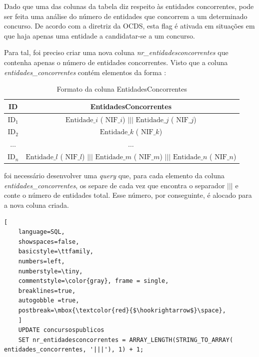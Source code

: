 Dado que uma das colunas da tabela diz respeito às entidades concorrentes, pode ser feita uma análise do número de entidades que concorrem a um determinado concurso. De acordo com a diretriz da OCDS, esta flag é ativada em situações em que haja apenas uma entidade a candidatar-se a um concurso. 

Para tal, foi preciso criar uma nova coluna \textit{nr\_entidadesconcorrentes} que contenha apenas o número de entidades concorrentes. Visto que a coluna \textit{entidades\_concorrentes} contém elementos da forma :



\begin{table}[H]
	\centering
	\begin{tabular}{|c|c|}
		\hline
		\textbf{ID}   & \textbf{EntidadesConcorrentes}                                                                                                      \\ \hline
		$\text{ID}_1$ & $\text{Entidade}\_i$ ( $\text{NIF}\_i$) $|||$ $\text{Entidade}\_j$ ( $\text{NIF}\_j$)                                               \\ \hline
		$\text{ID}_2$ & $\text{Entidade}\_k$ ( $\text{NIF}\_k$)                                                                                             \\ \hline
		$\dots$       & $\dots$                                                                                                                             \\ \hline
		$\text{ID}_n$ & $\text{Entidade}\_l$ ( $\text{NIF}\_l$) $|||$ $\text{Entidade}\_m$ ( $\text{NIF}\_m$) $|||$ $\text{Entidade}\_n$ ( $\text{NIF}\_n$) \\ \hline
	\end{tabular}
	\caption{Formato da coluna EntidadesConcorrentes}
\end{table}

foi necessário desenvolver uma \textit{query} que, para cada elemento da coluna \textit{entidades\_concorrentes}, os separe de cada vez que encontra o separador $|||$ e conte o número de entidades total. Esse número, por conseguinte, é alocado para a nova coluna criada. 


\begin{lstlisting}[
	language=SQL,
	showspaces=false,
	basicstyle=\ttfamily,
	numbers=left,
	numberstyle=\tiny,
	commentstyle=\color{gray}, frame = single,
	breaklines=true,
	autogobble =true,
	postbreak=\mbox{\textcolor{red}{$\hookrightarrow$}\space},
	]
	UPDATE concursospublicos
	SET nr_entidadesconcorrentes = ARRAY_LENGTH(STRING_TO_ARRAY( entidades_concorrentes, '|||'), 1) + 1;	
\end{lstlisting}



